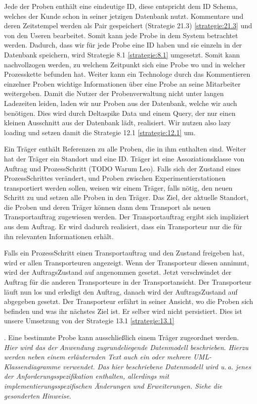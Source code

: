 \documentclass[enabledeprecatedfontcommands,fontsize=12pt,paper=a4,twoside]{scrartcl}
\begin{document}
{Jede der Proben enthält eine eindeutige ID, diese entspricht dem ID Schema,
welches der Kunde schon in seiner jetzigen Datenbank nutzt. Kommentare und deren
Zeitstempel werden als Pair gespeichert (Strategie 21.3) \ref{strategie:21.3}  und von den
Useren bearbeitet. Somit kann jede Probe in dem System betrachtet werden.
Dadurch, dass wir für jede Probe eine ID haben und sie einzeln in der Datenbank
speichern, wird Strategie 8.1 \ref{strategie:8.1} umgesetzt. Somit kann nachvollzogen werden, zu
welchem Zeitpunkt sich eine Probe wo und in welcher Prozesskette befunden hat.
Weiter kann ein Technologe durch das Kommentieren einzelner Proben wichtige
Informationen über eine Probe an seine Mitarbeiter weitergeben. Damit die Nutzer
der Probenverwaltung nicht unter langen Ladezeiten leiden, laden wir nur Proben
aus der Datenbank, welche wir auch benötigen. Dies wird durch Deltaspike Data
und einem Query, der nur einen kleinen Ausschnitt aus der Datenbank lädt,
realisiert. Wir nutzen also lazy loading und setzen damit die Strategie 12.1 \ref{strategie:12.1} um.

Ein Träger enthält Referenzen zu alle Proben, die in ihm enthalten sind. Weiter
hat der Träger ein Standort und eine ID. Träger ist eine Assoziationsklasse von
Auftrag und ProzessSchritt (TODO Warum Leo). Falls sich der Zustand eines
ProzessSchrittes verändert, und Proben zwischen Experimentierstationen
transportiert werden sollen, weisen wir einem Träger, falls nötig, den neuen
Schritt zu und setzen alle Proben in den Träger. Das Ziel, der aktuelle
Standort, die Proben und deren Träger können dann dem Transport als neuen
Transportauftrag zugewiesen werden. Der Transportauftrag ergibt sich impliziert
aus dem Auftrag. Er wird dadurch realisiert, dass ein Transporteur nur die für
ihn relevanten Informationen erhält.

Falls ein ProzessSchritt einen Transportauftrag und den Zustand freigeben hat, wird er
allen Transporteuren angezeigt. Wenn der Transporteur diesen annimmt, wird der
AuftragsZustand auf angenommen gesetzt. Jetzt verschwindet der Auftrag für
die anderen Transporteure in der Transportansicht. Der Transporteur läuft nun
los und erledigt den Auftrag, danach wird der AuftragsZustand auf abgegeben
gesetzt. Der Transporteur erfährt in seiner Ansicht, wo die Proben sich befinden
und was ihr nächstes Ziel ist. Er selber wird nicht persistiert. Dies ist unsere
Umsetzung von der Strategie 13.1 \ref{strategie:13.1} 




  . Eine bestimmte Probe kann ausschließlich einem Träger zugeordnet werden.
{\it Hier wird das der Anwendung zugrundeliegende Datenmodell
  beschrieben. Hierzu werden neben einem erläuternden Text auch ein
  oder mehrere {UML}-Klassendiagramme verwendet. Das hier beschriebene
  Datenmodell wird u.\,a. jenes der Anforderungsspezifikation enthalten,
  allerdings mit implementierungsspezifischen Änderungen und
  Erweiterungen. Siehe die gesonderten Hinweise.}
   
}
\end{document}
